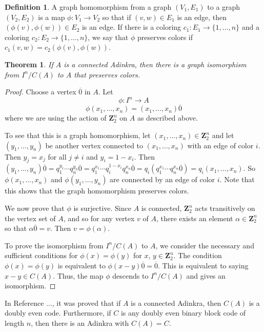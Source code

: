 \documentclass[12pt,twoside,singlespace]{article}
\numberwithin{equation}{section}
\newtheorem{thm}[equation]{Theorem}
\theoremstyle{definition}
\newtheorem{definition}[equation]{Definition}
\newcommand{\ZZ}{\mathbf{Z}}
\begin{document}
\begin{definition}
A graph homomorphism from a graph $(V_1,E_1)$ to a graph $(V_2,E_2)$ is a map $\phi:V_1\to V_2$ so that if $(v,w)\in E_1$ is an edge, then $(\phi(v),\phi(w))\in E_2$ is an edge.  If there is a coloring $c_1:E_1\to\{1,\ldots,n\}$ and a coloring $c_2:E_2\to\{1,\ldots,n\}$, we say that $\phi$ preserves colors if $c_1(v,w)=c_2(\phi(v),\phi(w))$.
\end{definition}

\begin{thm}
\label{thm:cubemodulocode}
If $A$ is a connected Adinkra, then there is a graph isomorphism from $I^n/C(A)$ to $A$ that preserves colors.
\end{thm}
\begin{proof}
Choose a vertex $\overline{0}$ in $A$.  Let
\[\phi:I^n\to A\]
\[\phi(x_1,\ldots,x_n)=(x_1,\ldots,x_n)\overline{0}\]
where we are using the action of $\ZZ_2^n$ on $A$ as described above.

To see that this is a graph homomorphism, let $(x_1,\ldots,x_n)\in\ZZ_2^n$ and let $(y_1,\ldots,y_n)$ be another vertex connected to $(x_1,\ldots,x_n)$ with an edge of color $i$.  Then $y_j=x_j$ for all $j\not=i$ and $y_i=1-x_i$.  Then $(y_1,\ldots,y_n)\overline{0}=q_1^{y_1}\cdots q_n^{y_n}\overline{0} =  q_1^{x_1}\cdots q_i^{1-x_i} q_n^{x_n}\overline{0}=q_i(q_1^{x_1}\cdots q_n^{x_n}\overline{0})=q_i(x_1,\ldots,x_n)$.  So $\phi(x_1,\ldots,x_n)$ and $\phi(y_1,\ldots,y_n)$ are connected by an edge of color $i$.  Note that this shows that the graph homomorphism preserves colors.

We now prove that $\phi$ is surjective.  Since $A$ is connected, $\ZZ_2^n$ acts transitively on the vertex set of $A$, and so for any vertex $v$ of $A$, there exists an element $\alpha \in\ZZ_2^n$ so that $\alpha \overline{0}=v$.  Then $v=\phi(\alpha)$.

To prove the isomorphism from $I^n/C(A)$ to $A$, we consider the necessary and sufficient conditions for $\phi(x)=\phi(y)$ for $x$, $y\in \ZZ_2^n$.  The condition $\phi(x)=\phi(y)$ is equivalent to $\phi(x-y)\overline{0}=\overline{0}$.  This is equivalent to saying $x-y\in C(A)$.  Thus, the map $\phi$ descends to $I^n/C(A)$ and gives an isomorphism.
\end{proof}

In Reference ..., it was proved that if $A$ is a connected Adinkra, then $C(A)$ is a doubly even code.  Furthermore, if $C$ is any doubly even binary block code of length $n$, then there is an Adinkra with $C(A)=C$.
\end{document}

